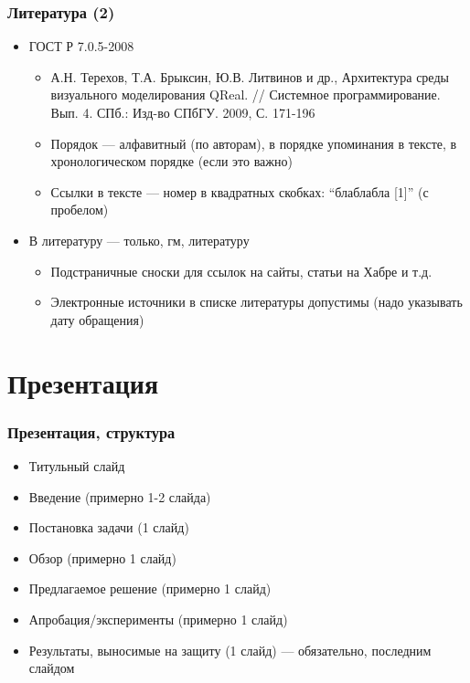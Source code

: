 \documentclass[xetex,mathserif,serif]{beamer}
\begin{document}
    \begin{frame}
        \frametitle{Литература (2)}
        \begin{itemize}
            \item ГОСТ Р 7.0.5-2008
            \begin{itemize}
                \item А.Н. Терехов, Т.А. Брыксин, Ю.В. Литвинов и др., Архитектура среды визуального моделирования QReal. // Системное программирование. Вып. 4. СПб.: Изд-во СПбГУ. 2009, С. 171-196
                \item Порядок --- алфавитный (по авторам), в порядке упоминания в тексте, в хронологическом порядке (если это важно)
                \item Ссылки в тексте --- номер в квадратных скобках: \enquote{блаблабла [1]} (с пробелом)
            \end{itemize}
            \item В литературу --- только, гм, литературу
            \begin{itemize}
                \item Подстраничные сноски для ссылок на сайты, статьи на Хабре и т.д.
                \item Электронные источники в списке литературы допустимы (надо указывать дату обращения)
            \end{itemize}
        \end{itemize}
    \end{frame}

    \section{Презентация}

    \begin{frame}
        \frametitle{Презентация, структура}
        \begin{itemize}
            \item Титульный слайд
            \item Введение (примерно 1-2 слайда)
            \item Постановка задачи (1 слайд)
            \item Обзор (примерно 1 слайд)
            \item Предлагаемое решение (примерно 1 слайд)
            \item Апробация/эксперименты (примерно 1 слайд)
            \item Результаты, выносимые на защиту (1 слайд) --- обязательно, последним слайдом
        \end{itemize}
    \end{frame}
\end{document}
